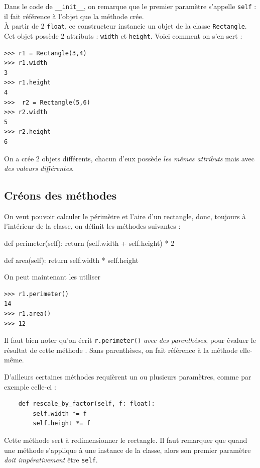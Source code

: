 \documentclass[a4paper,10pt,cours,firamath]{nsi}
\begin{document}
Dans le code de \texttt{__init__}, on remarque que le premier paramètre s'appelle \texttt{self} : il fait référence à l'objet que la méthode crée.\\
À partir de 2 \texttt{float}, ce constructeur instancie un objet de la classe \texttt{Rectangle}. Cet objet possède 2 attributs : \texttt{width} et \texttt{height}. Voici comment on s'en sert :

\begin{pyc}
    \begin{verbatim}
>>> r1 = Rectangle(3,4)
>>> r1.width
3
>>> r1.height
4
>>>  r2 = Rectangle(5,6)
>>> r2.width
5
>>> r2.height
6
        \end{verbatim}
\end{pyc}
On a crée 2 objets différents, chacun d'eux possède \textit{les mêmes attributs} mais avec \textit{des valeurs différentes}.

\subsection{Créons des méthodes}

On veut pouvoir calculer le périmètre et l'aire d'un rectangle, donc, toujours à l'intérieur de la classe, on définit les méthodes suivantes :

\begin{pyc}
    def perimeter(self):
    return (self.width + self.height) * 2
    
    def area(self):
    return self.width * self.height
\end{pyc}


On peut maintenant les utiliser 

\begin{pyc}
    \begin{verbatim}
>>> r1.perimeter()
14
>>> r1.area()
>>> 12
    \end{verbatim}
\end{pyc}
\begin{remarque}[]
    Il faut bien noter qu'on écrit \texttt{r.perimeter()} \textit{avec des parenthèses}, pour évaluer le résultat de cette méthode . Sans parenthèses, on fait référence à la méthode elle-même.\\
\end{remarque}
D'ailleurs certaines méthodes requièrent un ou plusieurs paramètres, comme par exemple celle-ci :

\begin{pyc}
    \begin{verbatim}
    def rescale_by_factor(self, f: float):
        self.width *= f
        self.height *= f
    \end{verbatim}
\end{pyc}
Cette méthode sert à redimensionner le rectangle. Il faut remarquer que quand une méthode s'applique à une instance de la classe, alors son premier paramètre \textit{doit impérativement} être \texttt{self}.
\end{document}
